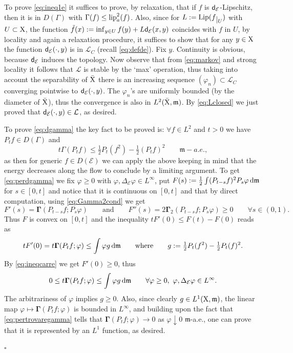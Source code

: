 \documentclass[11pt]{article}
\numberwithin{equation}{section}
\newenvironment{idea}{\removelastskip\par\medskip   %
\noindent{\em Idea of the proof} \rm}{\penalty-20\null\hfill$\square$\par\medbreak}
\newcommand{\restr}[1]{\lower3pt\hbox{$|_{#1}$}}
\newcommand{\X}{{\rm X}}
\newcommand{\sfd}{{\sf d}}
\newcommand{\mm}{{\mathfrak m}}
\renewcommand{\d}{{\rm d}}
\newcommand{\Lip}{{\rm Lip}}
\newcommand{\lipa}{{\rm lip}_a}
\newcommand{\Ggamma}{{\mathbf \Gamma}}
\begin{document}
\begin{idea}
To prove \eqref{eq:ineq1e} it suffices to prove, by relaxation, that if $f$ is $\sfd_{\mathcal E}$-Lipschitz, then it is in $D(\Gamma)$ with $\Gamma(f)\leq\lipa^2(f)$. Also, since for $L:=\Lip(f\restr U)$ with $U\subset\X$, the function $\tilde f(x):=\inf_{y\in U}f(y)+L\sfd_{\mathcal E}(x,y)$ coincides with $f$ in $U$, by locality and again a relaxation procedure, it suffices to show that for any $y\in\X$ the function $\sfd_{\mathcal E}(\cdot,y)$ is in $\mathcal L_C$ (recall \eqref{eq:defde}). Fix $y$. Continuity is obvious, because $\sfd_{\mathcal E}$ induces the topology.  Now observe that from \eqref{eq:markov} and strong locality  it follows that $\mathcal L$ is stable by the `max' operation, thus taking into account the separability of $\bar \X$ there is an increasing sequence  $(\varphi_n)\subset\mathcal L_C$ converging pointwise to $\sfd_{\mathcal E}(\cdot,y)$. The $\varphi_n$'s are uniformly bounded (by the diameter of $\bar \X$), thus the convergence is also in $L^2(\bar\X,\mm)$. By \eqref{eq:Lclosed} we just proved that   $\sfd_{\mathcal E}(\cdot,y)\in\mathcal L$, as desired.


To prove \eqref{eq:dgamma} the key fact to be proved is: $\forall f\in L^2$ and $t>0$ we have $P_tf\in D(\Gamma)$ and 
\begin{equation}
\label{eq:perdgamma}
t\Gamma(P_tf)\leq\tfrac12P_t(f^2)-\tfrac12(P_tf)^2\qquad\mm-a.e.,
\end{equation}
as then for generic $f\in D(\mathcal E)$ we can apply the above keeping in mind that the energy decreases along the flow to conclude by a limiting argument. To get \eqref{eq:perdgamma} we fix $\varphi\geq0$ with $\varphi,\Delta_{\mathcal E}\varphi\in L^\infty$, put $F(s):=\tfrac12\int (P_{t-s}f)^2 P_s\varphi\,\d\mm $ for $s\in[0,t]$ and notice that it is continuous on $[0,t] $ and that by direct computation, using \eqref{eq:Gamma2cond} we get 
\begin{equation}
\label{eq:Fprimo}
F'(s)=\Ggamma(P_{t-s}f;P_s\varphi)\qquad\text{and}\qquad F''(s)=2\Ggamma_2(P_{t-s}f;P_s\varphi)\geq 0\qquad\forall s\in(0,1).
\end{equation}
Thus $F$ is convex on $[0,t]$ and the inequality $tF'(0)\leq F(t)-F(0)$ reads as
\[
tF'(0)=t\Ggamma(P_tf;\varphi)\leq \int\varphi g\,\d\mm\qquad\text{where}\qquad g:=\tfrac12P_t(f^2)-\tfrac12P_t(f)^2.
\]
By \eqref{eq:ineqcarre}  we get $F'(0)\geq0$, thus
\begin{equation}
\label{eq:pertrovaregamma}
0\leq t\Ggamma(P_tf;\varphi)\leq \int\varphi g\,\d \mm\qquad\forall \varphi\geq 0,\ \varphi,\Delta_{\mathcal E}\varphi\in L^\infty.
\end{equation}
The arbitrariness of $\varphi$ implies $g\geq 0$. Also,  since clearly $g\in L^1(\X,\mm)$, the linear map $\varphi\mapsto \Ggamma(P_tf;\varphi)$ is bounded in $L^\infty$, and building upon the fact that \eqref{eq:pertrovaregamma} tells that $\Ggamma(P_tf;\varphi)\to 0$ as $\varphi\downarrow0$ $\mm$-a.e., one can prove that it is represented by an $L^1$ function, as desired.




\end{idea}
\end{document}
